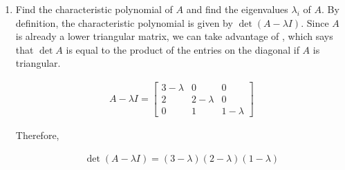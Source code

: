 \documentclass[10pt,letterpaper,final]{report}
\begin{document}
\begin{enumerate}[label=(\alph*)]
        Therefore, $A$ is the standard matrix for $T$.

  \item Find the characteristic polynomial of $A$ and find the eigenvalues $\lambda_i$ of $A$.
        By definition, the characteristic polynomial is given by $\det (A - \lambda I)$. Since $A$ is already a lower triangular matrix, we can take advantage of \cite[Theorem~3.2, p.~175]{LayEtAl2020LinearAlgebraAndItsApplications}, which says that $\det A$ is equal to the product of the entries on the diagonal if $A$ is triangular.

        \begin{align*}
          A - \lambda I = \begin{bmatrix}
                            3 - \lambda & 0           & 0           \\
                            2           & 2 - \lambda & 0           \\
                            0           & 1           & 1 - \lambda
                          \end{bmatrix}
        \end{align*}

        Therefore,

        \begin{align*}
          \det  (A - \lambda I) = (3 - \lambda)(2 - \lambda)(1 - \lambda)
        \end{align*}


\end{enumerate}
\end{document}
